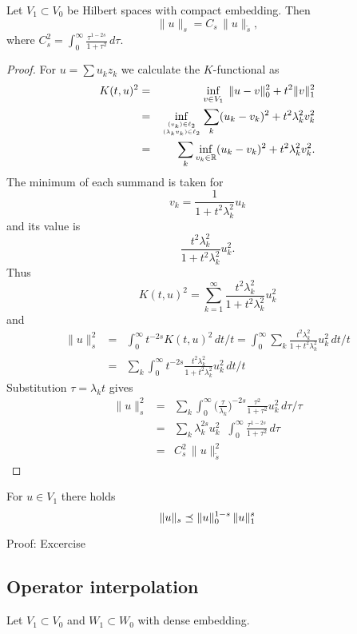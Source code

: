 \begin{theorem} Let $V_1 \subset V_0$ be Hilbert spaces with compact embedding.
Then
$$
\| u \|_s = C_s \, \| u \|_{\tilde s},
$$
where $C_s^2 = \int_0^\infty \frac{\tau^{1-2s}}{1+\tau^2} \, d\tau$.
\end{theorem}
\begin{proof} For $u = \sum u_k z_k$ we calculate the $K$-functional as
\begin{eqnarray*}
K(t,u)^2 & = & \inf_{v \in V_1} \; \| u - v \|_0^2 + t^2 \| v \|_1^2 \\
 & = & \inf_{(v_k) \in \ell_2 \atop (\lambda_k v_k) \in \ell_2}
  \sum_k (u_k - v_k)^2 + t^2 \lambda_k^2 v_k^2 \\
 & = & \sum_k \inf_{v_k \in {\mathbb R}} (u_k - v_k)^2 + t^2 \lambda_k^2 v_k^2.
\end{eqnarray*} 
The minimum of each summand is taken for 
$$
v_k = \frac{1}{1+t^2\lambda_k^2} u_k
$$
and its value is
$$
\frac{t^2 \lambda_k^2}{1+t^2 \lambda_k^2} u_k^2.
$$
Thus
$$
K(t,u)^2 = \sum_{k=1}^\infty \frac{ t^2 \lambda_k^2}{1+t^2 \lambda_k^2} u_k^2
$$
and
\begin{eqnarray*}
\| u \|_s^2 & = &\int_0^\infty t^{-2s} K(t,u)^2 \, dt / t 
 = \int_0^\infty \sum_k \frac{ t^2 \lambda_k^2}{1+t^2 \lambda_k^2} u_k^2 \, dt/t \\
& = & \sum_k \int_0^\infty t^{-2s} \frac{t^2\lambda_k^2}{1+t^2 \lambda_k^2} u_k^2 \, dt/t
\end{eqnarray*}
Substitution $\tau = \lambda_k t$ gives
\begin{eqnarray*}
\| u \|_s^2 & = & \sum_k \int_0^\infty \Big(\frac{\tau}{\lambda_k}\Big) ^{-2s} \frac{\tau^2}{1+\tau^2} u_k^2 \, d \tau/\tau \\
& = & \sum_k \lambda_k^{2s} u_k^2 \; \; \int_0^\infty \frac{\tau^{1-2s}}{1+\tau^2} \, d \tau \\
& = & C_s^2 \, \| u \|_{\tilde s}^2
\end{eqnarray*}
\end{proof}


\begin{theorem} For $u \in V_1$ there holds 
$$
\| u \|_s \preceq \| u \|_0^{1-s} \, \| u \|_1^s
$$
\end{theorem}
Proof: Excercise

\subsection{Operator interpolation}
Let $V_1 \subset V_0$ and $W_1 \subset W_0$ with dense embedding. 

